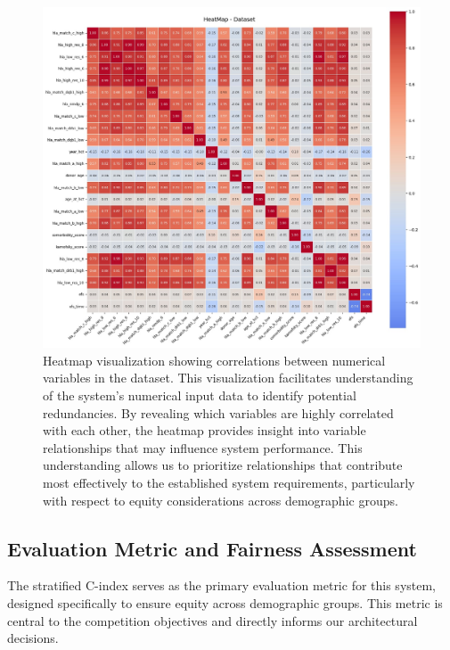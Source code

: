 \begin{figure}[H]
    \centering
    \includegraphics[width=1\textwidth]{figures/DatasetHeatmap.jpg}
    \caption{Heatmap visualization showing correlations between numerical variables in the dataset. This visualization facilitates understanding of the system's numerical input data to identify potential redundancies. By revealing which variables are highly correlated with each other, the heatmap provides insight into variable relationships that may influence system performance. This understanding allows us to prioritize relationships that contribute most effectively to the established system requirements, particularly with respect to equity considerations across demographic groups.}
    \label{fig:dataset_heatmap}
\end{figure}

\subsection{Evaluation Metric and Fairness Assessment}

The stratified C-index serves as the primary evaluation metric for this system, designed specifically to ensure equity across demographic groups. This metric is central to the competition objectives and directly informs our architectural decisions.

